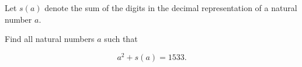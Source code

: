 Let $s(a)$ denote the sum of the digits in the decimal representation of a natural number $a$.



Find all natural numbers $a$ such that

\[
a^2 + s(a) = 1533.
\]
